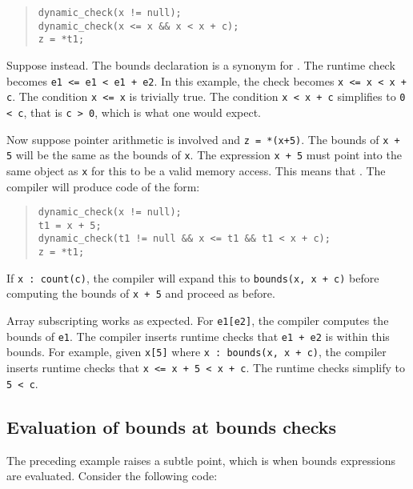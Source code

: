 \begin{quote}
\begin{verbatim}
dynamic_check(x != null);
dynamic_check(x <= x && x < x + c);
z = *t1;
\end{verbatim}
\end{quote}

Suppose  instead. The bounds declaration 
 is a synonym for 
.
The runtime check becomes \texttt{e1 \textless{}= e1 \textless{} e1 + e2}.
In this example, the check becomes \texttt{x \textless{}= x \textless{}
x + c}. The condition \texttt{x \textless{}= x} is trivially true. The
condition \texttt{x \textless{} x + c} simplifies to \texttt{0
\textless{} c}, that is \texttt{c \textgreater{} 0}, which is what one
would expect.

Now suppose pointer arithmetic is involved and \texttt{z = *(x+5)}. The
bounds of \texttt{x + 5} will be the same as the bounds of \texttt{x}.
The expression \texttt{x + 5} must point into the same object as
\texttt{x} for this to be a valid memory access. This means that
.
The compiler will produce code of the form:

\begin{quote}
\begin{verbatim}
dynamic_check(x != null);
t1 = x + 5;
dynamic_check(t1 != null && x <= t1 && t1 < x + c);
z = *t1;
\end{verbatim}
\end{quote}

If \verb|x : count(c)|, the compiler will expand this to
\verb|bounds(x, x + c)| before computing the bounds of \verb|x + 5|
and proceed as before.

Array subscripting works as expected. For \texttt{e1[e2]}, the
compiler computes the bounds of \texttt{e1}. The compiler inserts
runtime checks that \texttt{e1 + e2} is within this bounds. For example,
given \verb|x[5]| where \verb|x : bounds(x, x + c)|, the
compiler inserts runtime checks that \verb|x <= x + 5 < x + c|. 
The runtime checks simplify to \verb|5 < c|.

\subsection{Evaluation of bounds at bounds checks}

The preceding example raises a subtle point, which is when bounds
expressions are evaluated. Consider the following code:

